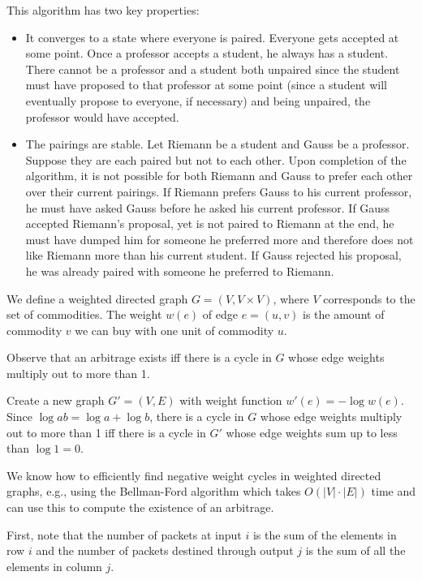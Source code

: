 This algorithm has two key properties:
\begin{itemize}
\itemsep 1pt
\item It converges to a state where everyone is paired. Everyone gets accepted at some point. Once a professor accepts a student, he always has a student.  There cannot be a professor and a student both unpaired since the student must have proposed to that professor at some point (since a student will eventually propose to everyone, if necessary) and being unpaired, the professor would have accepted.
\item The pairings are stable. Let Riemann be a student and Gauss be a professor. Suppose they are each paired but not to each other. 
Upon completion of the algorithm, it is not possible for both Riemann and Gauss 
to prefer each other over their current pairings. If Riemann prefers Gauss to his current professor, he must have asked Gauss before he asked his current professor. If Gauss accepted Riemann's proposal, yet is not paired to Riemann at the end, he must have dumped him for someone he preferred more and therefore does not like Riemann more than his current student. If Gauss rejected his proposal, he was already paired with someone he preferred to Riemann.
\end{itemize}


We define a weighted directed graph $G = (V,V \times V)$, where $V$ corresponds to 
the set of commodities. The weight $w(e)$ of edge $ e = (u,v)$ is  the amount
of commodity $v$ we can buy with one unit of commodity $u$.

Observe that an arbitrage exists iff there is a cycle in $G$ 
whose edge weights multiply out to more than 1. 

Create a new graph $G' = (V,E)$ with weight function $w'(e) = -\log w(e)$. 
Since $\log ab = \log a + \log b$, there is a cycle in $G$ whose edge weights
multiply out to more than 1 iff there is a cycle in $G'$ whose edge weights
sum up to less than $\log 1 = 0$.  

We know how to efficiently find negative weight cycles in weighted directed graphs,
e.g., using the Bellman-Ford algorithm which takes $O(|V| \cdot |E|)$
time and
can use this to compute the existence of an arbitrage.



First, note that the number of packets at input $i$ is the sum
of the elements in row $i$ and the number of packets destined
through output $j$ is the sum of all the elements in column $j$.

